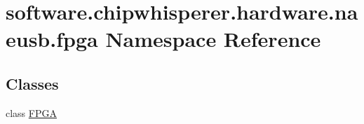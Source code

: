 \hypertarget{namespacesoftware_1_1chipwhisperer_1_1hardware_1_1naeusb_1_1fpga}{}\section{software.\+chipwhisperer.\+hardware.\+naeusb.\+fpga Namespace Reference}
\label{namespacesoftware_1_1chipwhisperer_1_1hardware_1_1naeusb_1_1fpga}
\subsection*{Classes}
\begin{DoxyCompactItemize}
\item 
class \hyperlink{classsoftware_1_1chipwhisperer_1_1hardware_1_1naeusb_1_1fpga_1_1FPGA}{F\+P\+G\+A}
\end{DoxyCompactItemize}
